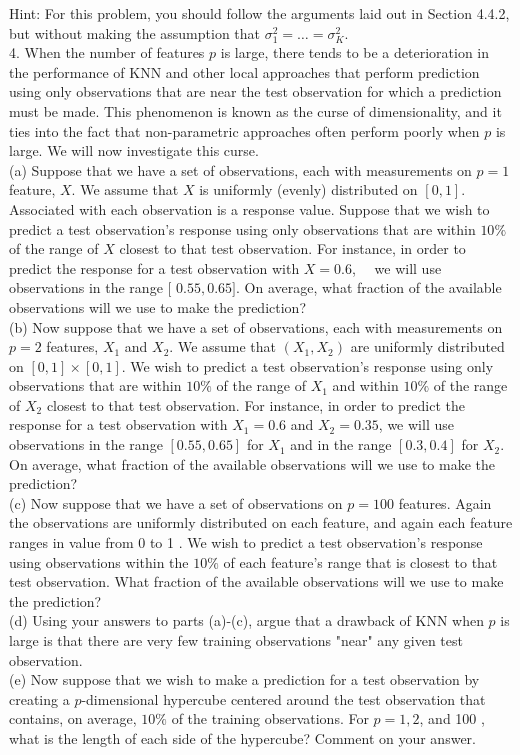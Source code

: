 \documentclass[10pt]{article}
\begin{document}
Hint: For this problem, you should follow the arguments laid out in Section 4.4.2, but without making the assumption that $\sigma_{1}^{2}=\ldots=\sigma_{K}^{2}$.\\
4. When the number of features $p$ is large, there tends to be a deterioration in the performance of KNN and other local approaches that perform prediction using only observations that are near the test observation for which a prediction must be made. This phenomenon is known as the curse of dimensionality, and it ties into the fact that non-parametric approaches often perform poorly when $p$ is large. We will now investigate this curse.\\
(a) Suppose that we have a set of observations, each with measurements on $p=1$ feature, $X$. We assume that $X$ is uniformly (evenly) distributed on $[0,1]$. Associated with each observation is a response value. Suppose that we wish to predict a test observation's response using only observations that are within $10 \%$ of the range of $X$ closest to that test observation. For instance, in order to predict the response for a test observation with $X=0.6$,\
\
we will use observations in the range [ $0.55,0.65]$. On average, what fraction of the available observations will we use to make the prediction?\\
(b) Now suppose that we have a set of observations, each with measurements on $p=2$ features, $X_{1}$ and $X_{2}$. We assume that $\left(X_{1}, X_{2}\right)$ are uniformly distributed on $[0,1] \times[0,1]$. We wish to predict a test observation's response using only observations that are within $10 \%$ of the range of $X_{1}$ and within $10 \%$ of the range of $X_{2}$ closest to that test observation. For instance, in order to predict the response for a test observation with $X_{1}=0.6$ and $X_{2}=0.35$, we will use observations in the range $[0.55,0.65]$ for $X_{1}$ and in the range $[0.3,0.4]$ for $X_{2}$. On average, what fraction of the available observations will we use to make the prediction?\\
(c) Now suppose that we have a set of observations on $p=100$ features. Again the observations are uniformly distributed on each feature, and again each feature ranges in value from 0 to 1 . We wish to predict a test observation's response using observations within the $10 \%$ of each feature's range that is closest to that test observation. What fraction of the available observations will we use to make the prediction?\\
(d) Using your answers to parts (a)-(c), argue that a drawback of KNN when $p$ is large is that there are very few training observations "near" any given test observation.\\
(e) Now suppose that we wish to make a prediction for a test observation by creating a $p$-dimensional hypercube centered around the test observation that contains, on average, $10 \%$ of the training observations. For $p=1,2$, and 100 , what is the length of each side of the hypercube? Comment on your answer.
\end{document}
